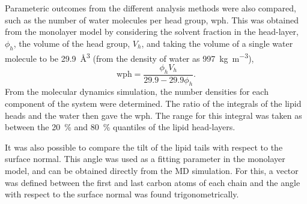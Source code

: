 \documentclass[amsmath,amssymb,twocolumn,superscriptaddress]{revtex4-1}
\begin{document}
Parameteric outcomes from the different analysis methods were also compared, such as the number of water molecules per head group, wph.
This was obtained from the monolayer model by considering the solvent fraction in the head-layer, $\phi_h$, the volume of the head group, $V_h$, and taking the volume of a single water molecule to be \SI{29.9}{\cubic\angstrom} (from the density of water as \SI{997}{\kilo\gram\per\cubic\meter}),
%
\begin{equation}
  \text{wph} = \frac{\phi_hV_h}{29.9 - 29.9\phi_h}.
  \label{equ:wph}
\end{equation}
%
From the molecular dynamics simulation, the number densities for each component of the system were determined.
The ratio of the integrals of the lipid heads and the water then gave the wph.
The range for this integral was taken as between the \SI{20}{\percent} and \SI{80}{\percent} quantiles of the lipid head-layers.

It was also possible to compare the tilt of the lipid tails with respect to the surface normal.
This angle was used as a fitting parameter in the monolayer model, and can be obtained directly from the MD simulation.
For this, a vector was defined between the first and last carbon atoms of each chain and the angle with respect to the surface normal was found trigonometrically.
\end{document}
